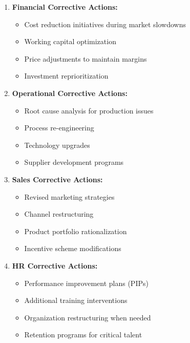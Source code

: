 \documentclass[12pt,a4paper]{article}
\begin{document}
\begin{enumerate}[leftmargin=*]
    \item \textbf{Financial Corrective Actions:}
    \begin{itemize}
        \item Cost reduction initiatives during market slowdowns
        \item Working capital optimization
        \item Price adjustments to maintain margins
        \item Investment reprioritization
    \end{itemize}
    
    \item \textbf{Operational Corrective Actions:}
    \begin{itemize}
        \item Root cause analysis for production issues
        \item Process re-engineering
        \item Technology upgrades
        \item Supplier development programs
    \end{itemize}
    
    \item \textbf{Sales Corrective Actions:}
    \begin{itemize}
        \item Revised marketing strategies
        \item Channel restructuring
        \item Product portfolio rationalization
        \item Incentive scheme modifications
    \end{itemize}
    
    \item \textbf{HR Corrective Actions:}
    \begin{itemize}
        \item Performance improvement plans (PIPs)
        \item Additional training interventions
        \item Organization restructuring when needed
        \item Retention programs for critical talent
    \end{itemize}
\end{enumerate}

\newpage
\end{document}
